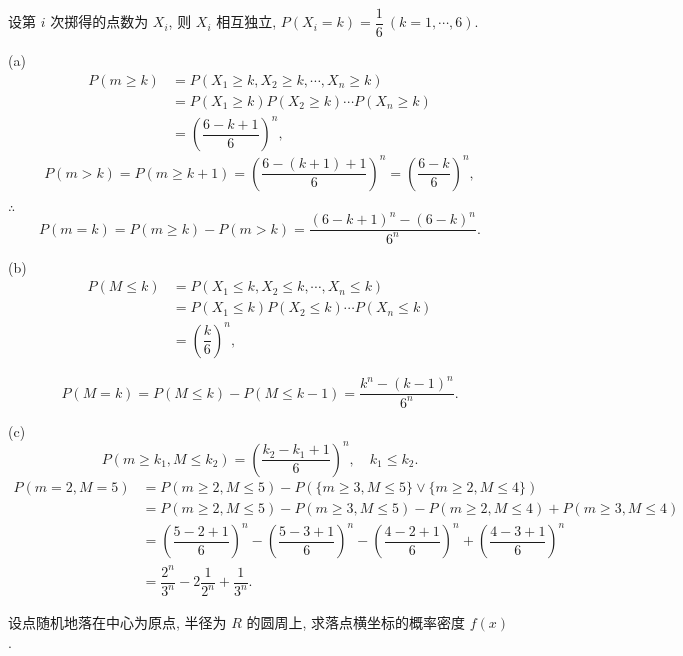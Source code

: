 \documentclass{ctexart}
\begin{document}
\begin{solution}
    设第 $i$ 次掷得的点数为 $X_i$, 则 $X_i$ 相互独立, $P(X_i=k)=\dfrac{1}{6}\ (k=1,\cdots,6)$.

    (a)
    \begin{align*}
        P(m\geq k) & =P(X_1\geq k,X_2\geq k,\cdots,X_n\geq k) \\
        & =P(X_1\geq k)P(X_2\geq k)\cdots P(X_n\geq k) \\
        & =\left(\dfrac{6-k+1}{6}\right)^n,
    \end{align*}
    \[P(m>k)=P(m\geq k+1)=\left(\dfrac{6-(k+1)+1}{6}\right)^n=\left(\dfrac{6-k}{6}\right)^n,\]
    
    $\therefore$
    \[P(m=k)=P(m\geq k)-P(m>k)=\dfrac{(6-k+1)^n-(6-k)^n}{6^n}.\]

    (b)
    \begin{align*}
        P(M\leq k) & =P(X_1\leq k,X_2\leq k,\cdots,X_n\leq k) \\
        & =P(X_1\leq k)P(X_2\leq k)\cdots P(X_n\leq k) \\
        & =\left(\dfrac{k}{6}\right)^n,
    \end{align*}

    \[P(M=k)=P(M\leq k)-P(M\leq k-1)=\dfrac{k^n-(k-1)^n}{6^n}.\]

    (c)
    \[P(m\geq k_1,M\leq k_2)=\left(\dfrac{k_2-k_1+1}{6}\right)^n,\quad k_1\leq k_2.\]
    \begin{align*}
        P(m=2,M=5) & =P(m\geq 2,M\leq 5)-P(\{m\geq 3,M\leq 5\}\vee\{m\geq 2,M\leq 4\}) \\
        & =P(m\geq 2,M\leq 5)-P(m\geq 3,M\leq 5)-P(m\geq 2,M\leq 4)+P(m\geq 3,M\leq 4) \\
        & =\left(\dfrac{5-2+1}{6}\right)^n-\left(\dfrac{5-3+1}{6}\right)^n-\left(\dfrac{4-2+1}{6}\right)^n+\left(\dfrac{4-3+1}{6}\right)^n \\
        & =\dfrac{2^n}{3^n}-2\dfrac{1}{2^n}+\dfrac{1}{3^n}.
    \end{align*}
\end{solution}
\begin{exercise}\label{ex3.26}
    设点随机地落在中心为原点, 半径为 $R$ 的圆周上, 求落点横坐标的概率密度 $f(x)$.
\end{exercise}
\end{document}
